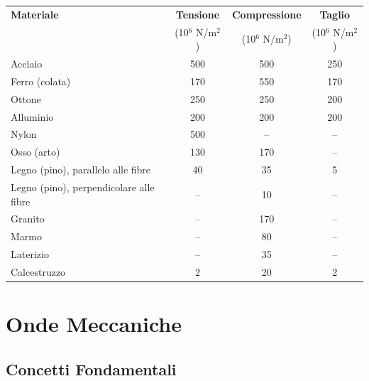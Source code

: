\documentclass[a4paper,11pt]{article}
\begin{document}
\begin{center}
\begin{minipage}{\linewidth}
\centering
\small
\begin{tabular}{lccc}
\toprule
\textbf{Materiale} & \textbf{Tensione} & \textbf{Compressione} & \textbf{Taglio} \\
 & (10$^6$ N/m$^2$) & (10$^6$ N/m$^2$) & (10$^6$ N/m$^2$) \\
\midrule
Acciaio & 500 & 500 & 250 \\
Ferro (colata) & 170 & 550 & 170 \\
Ottone & 250 & 250 & 200 \\
Alluminio & 200 & 200 & 200 \\
Nylon & 500 & -- & -- \\
Osso (arto) & 130 & 170 & -- \\
Legno (pino), parallelo alle fibre & 40 & 35 & 5 \\
Legno (pino), perpendicolare alle fibre & -- & 10 & -- \\
Granito & -- & 170 & -- \\
Marmo & -- & 80 & -- \\
Laterizio & -- & 35 & -- \\
Calcestruzzo & 2 & 20 & 2 \\
\bottomrule
\end{tabular}
\end{minipage}
\end{center}

\newpage
\section{Onde Meccaniche}

\subsection{Concetti Fondamentali}
\end{document}
